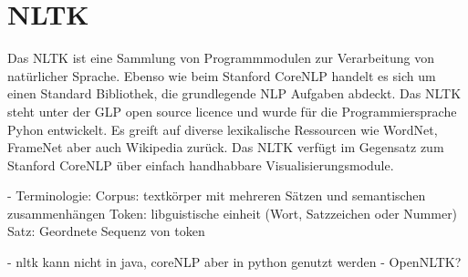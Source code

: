 \section{NLTK}

Das \ac{NLTK} ist eine Sammlung von Programmmodulen zur Verarbeitung von natürlicher Sprache. Ebenso wie beim Stanford CoreNLP handelt es sich um einen Standard Bibliothek, die grundlegende \ac{NLP} Aufgaben abdeckt. Das \ac{NLTK} steht unter der GLP open source licence und wurde für die Programmiersprache Pyhon entwickelt. Es greift auf diverse lexikalische Ressourcen wie WordNet, FrameNet aber auch Wikipedia zurück. Das \ac{NLTK} verfügt im Gegensatz zum Stanford CoreNLP über einfach handhabbare Visualisierungsmodule.


- Terminologie:
 Corpus: textkörper mit mehreren Sätzen und semantischen zusammenhängen
 Token: libguistische einheit (Wort, Satzzeichen oder Nummer)
 Satz: Geordnete Sequenz von token
 
 - nltk kann nicht in java, coreNLP aber in python genutzt werden
 - OpenNLTK?

